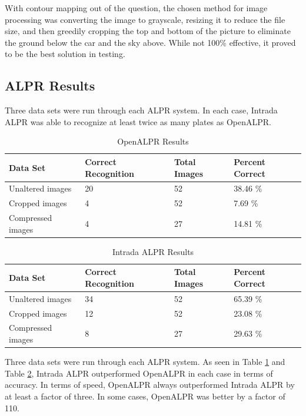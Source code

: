 \documentclass[11pt, oneside, fullpage, doublespace]{article}
\begin{document}
With contour mapping out of the question, the chosen method for image processing was converting the image to grayscale, resizing it to reduce the file size, and then greedily cropping the top and bottom of the picture to eliminate the ground below the car and the sky above. While not 100\% effective, it proved to be the best solution in testing.

\subsection{ALPR Results}
Three data sets were run through each ALPR system. In each case, Intrada ALPR was able to recognize at least twice as many plates as OpenALPR.

\begin{table}[h!]
\begin{center}
\begin{tabular}{| l || l | l | l |}
\hline
Data Set & Correct Recognition & Total Images & Percent Correct \\ \hline
Unaltered images & 20 & 52 & 38.46 \% \\ \hline
Cropped images & 4 & 52 & 7.69 \% \\ \hline
Compressed images & 4 & 27 & 14.81 \% \\ \hline
\end{tabular}
\end{center}
\caption{OpenALPR Results}
\label{tab:openalprresults}
\end{table}

\begin{table}[h!]
\begin{center}
\begin{tabular}{| l || l | l | l |}
\hline
Data Set & Correct Recognition & Total Images & Percent Correct \\ \hline
Unaltered images & 34 & 52 & 65.39 \% \\ \hline
Cropped images & 12 & 52 & 23.08 \% \\ \hline
Compressed images & 8 & 27 & 29.63 \% \\ \hline
\end{tabular}
\end{center}
\caption{Intrada ALPR Results}
\label{tab:intradaresults}
\end{table}
Three data sets were run through each ALPR system. As seen in Table \ref{tab:openalprresults} and Table \ref{tab:intradaresults}, Intrada ALPR outperformed OpenALPR in each case in terms of accuracy. In terms of speed, OpenALPR always outperformed Intrada ALPR by at least a factor of three. In some cases, OpenALPR was better by a factor of 110.
\end{document}
